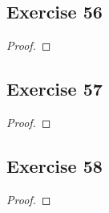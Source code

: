 \documentclass[14pt]{extarticle}
\begin{document}
\subsection{Exercise 56}

\begin{proof}

\end{proof}

\subsection{Exercise 57}

\begin{proof}

\end{proof}

\subsection{Exercise 58}

\begin{proof}

\end{proof}
\end{document}
